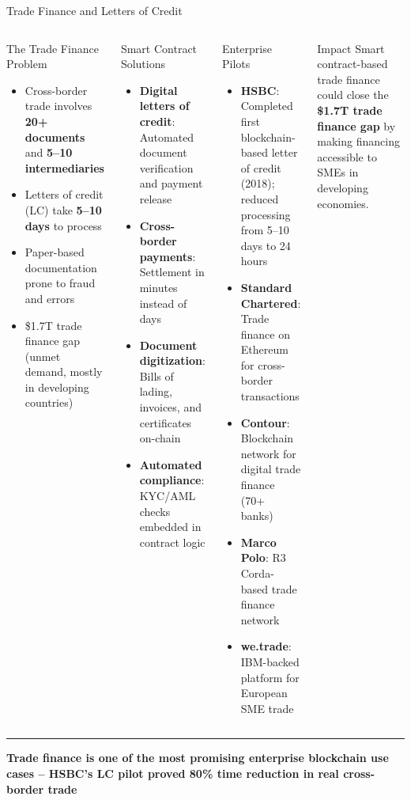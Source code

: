 \documentclass[8pt,aspectratio=169]{beamer}
\newcommand{\bottomnote}[1]{\vfill\vspace{-2mm}\textcolor{mllavender2}{\rule{\textwidth}{0.4pt}}\vspace{1mm}\footnotesize\textbf{#1}}
\begin{document}
\begin{frame}{Trade Finance and Letters of Credit}
\begin{columns}[T]
\begin{block}{The Trade Finance Problem}
\footnotesize
\begin{itemize}
  \item Cross-border trade involves \textbf{20+ documents} and \textbf{5--10 intermediaries}
  \item Letters of credit (LC) take \textbf{5--10 days} to process
  \item Paper-based documentation prone to fraud and errors
  \item \$1.7T trade finance gap (unmet demand, mostly in developing countries)
\end{itemize}
\end{block}
\vspace{2mm}
\begin{block}{Smart Contract Solutions}
\footnotesize
\begin{itemize}
  \item \textbf{Digital letters of credit}: Automated document verification and payment release
  \item \textbf{Cross-border payments}: Settlement in minutes instead of days
  \item \textbf{Document digitization}: Bills of lading, invoices, and certificates on-chain
  \item \textbf{Automated compliance}: KYC/AML checks embedded in contract logic
\end{itemize}
\end{block}

\begin{exampleblock}{Enterprise Pilots}
\footnotesize
\begin{itemize}
  \item \textbf{HSBC}: Completed first blockchain-based letter of credit (2018); reduced processing from 5--10 days to 24 hours
  \item \textbf{Standard Chartered}: Trade finance on Ethereum for cross-border transactions
  \item \textbf{Contour}: Blockchain network for digital trade finance (70+ banks)
  \item \textbf{Marco Polo}: R3 Corda-based trade finance network
  \item \textbf{we.trade}: IBM-backed platform for European SME trade
\end{itemize}
\end{exampleblock}
\vspace{2mm}
\begin{alertblock}{Impact}
\footnotesize
Smart contract-based trade finance could close the \textbf{\$1.7T trade finance gap} by making financing accessible to SMEs in developing economies.
\end{alertblock}
\end{columns}
\bottomnote{Trade finance is one of the most promising enterprise blockchain use cases -- HSBC's LC pilot proved 80\% time reduction in real cross-border trade}
\end{frame}
\end{document}
